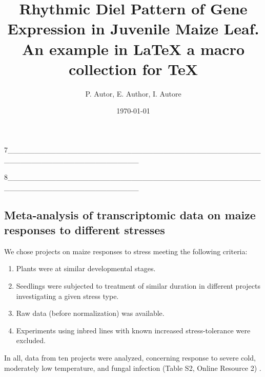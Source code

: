7________________________________________________________________________

\title{Rhythmic Diel Pattern of Gene Expression in Juvenile Maize Leaf. An example in \LaTeX{} a macro collection for \TeX{}}
\author{P. Autor, E. Author, I. Autore}
\begin{comment}
przejście do nowego wiersza (komenda \\, mozna uzyc \newline - (8) sproboj) pozwala wpisać wszystkich autorów jesli jest ich wielu i nie mieszczą sie w jednym wierszu
\end{comment}

\date{\today}%


8________________________________________________________________________

\subsection{Meta‐analysis of transcriptomic data on maize responses to different stresses}

We chose projects on maize responses to stress
meeting the following criteria:

\begin{enumerate}%
    \item Plants were at similar developmental stages.
\item Seedlings were subjected to treatment of similar duration in different projects investigating a given stress type.
\item Raw data (before normalization) was available.
\item Experiments using inbred lines with known increased
stress-tolerance were excluded.
\end{enumerate}

In all, data from ten projects \cite{cimmyt17} were analyzed, concerning
response to severe cold, moderately low temperature, and
fungal infection (Table S2, Online Resource 2) \cite{rakoczy07}.

